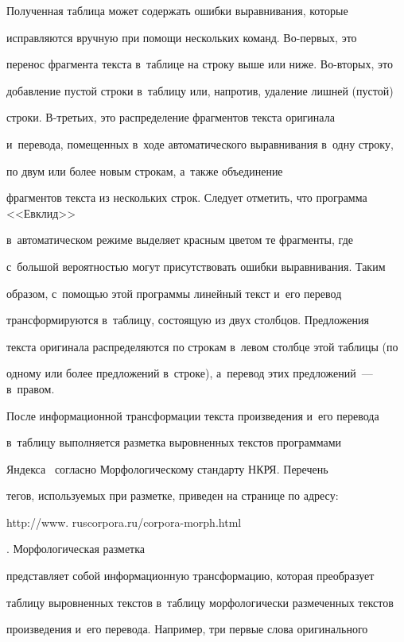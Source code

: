   


  Полученная таблица может содержать ошибки выравнивания, которые 


исправляются вручную при помощи нескольких команд. Во-пер\-вых, это 


перенос фрагмента текста в~таблице на строку выше или ниже. Во-вто\-рых, это 


добавление пустой строки в~таблицу или, напротив, удаление лишней (пустой) 


строки. В-треть\-их, это распределение фрагментов текста оригинала 


и~перевода, помещенных в~ходе автоматического выравнивания в~одну строку, 


по двум или более новым строкам, а~также объединение  


фрагментов текста из нескольких строк. Следует отметить, что программа <<Евклид>> 


в~автоматическом режиме выделяет красным цветом те фрагменты, где 


с~большой вероятностью могут присутствовать ошибки выравнивания. Таким 


образом, с~помощью этой программы линейный текст и~его перевод 


трансформируются в~таблицу, состоящую из двух столбцов. Предложения 


текста оригинала распределяются по строкам в~левом столбце этой таблицы (по 


одному или более предложений в~строке), а~перевод этих предложений~--- в~правом.


  


  После информационной трансформации текста произведения и~его перевода 


в~таблицу выполняется разметка выровненных текстов программами 


Яндекса~\cite{13-gz, 14-gz} согласно Морфологическому стандарту НКРЯ. Перечень 


тегов, используемых при разметке, приведен на странице по адресу: {\small{\sf 


http://www. ruscorpora.ru/corpora-morph.html}}. Морфологическая разметка 


представляет собой информационную трансформацию, которая преобразует 


таблицу выровненных текстов в~таблицу морфологически размеченных текстов 


произведения и~его перевода. Например, три первые слова оригинального 


